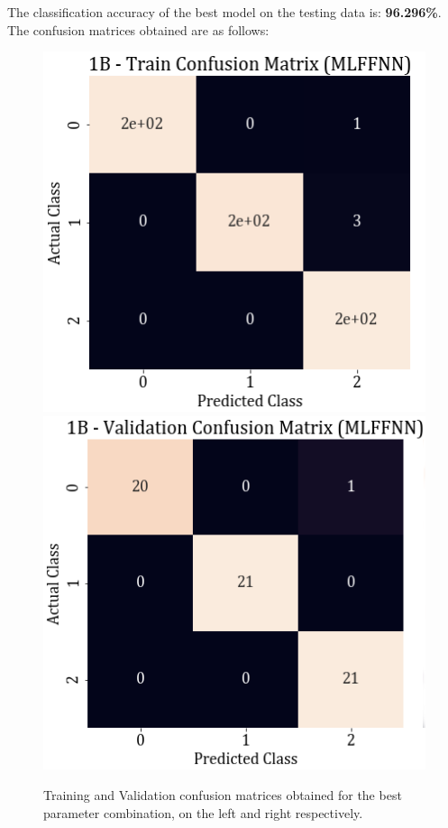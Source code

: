 \documentclass[11pt,a4paper]{article}
\newcommand{\noi}{\noindent}
\begin{document}
\noi
The classification accuracy of the best model on the testing data is: \textbf{96.296\%}. The confusion matrices obtained are as follows:
\begin{figure}[H]
    \centering
    \includegraphics[scale=0.55]{images/1B_MLFFNN_train_confmat.png}
    \includegraphics[scale=0.55]{images/1B_MLFFNN_val_confmat.png}
    \caption{Training and Validation confusion matrices obtained for the best parameter combination, on the left and right respectively.}
\end{figure}
\end{document}

